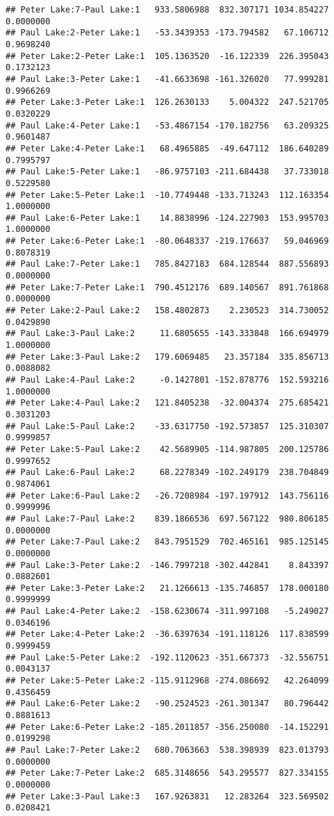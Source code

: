 \documentclass[]{article}
\begin{document}
\begin{verbatim}
## Peter Lake:7-Paul Lake:1   933.5806988  832.307171 1034.854227 0.0000000
## Paul Lake:2-Peter Lake:1   -53.3439353 -173.794582   67.106712 0.9698240
## Peter Lake:2-Peter Lake:1  105.1363520  -16.122339  226.395043 0.1732123
## Paul Lake:3-Peter Lake:1   -41.6633698 -161.326020   77.999281 0.9966269
## Peter Lake:3-Peter Lake:1  126.2630133    5.004322  247.521705 0.0320229
## Paul Lake:4-Peter Lake:1   -53.4867154 -170.182756   63.209325 0.9601487
## Peter Lake:4-Peter Lake:1   68.4965885  -49.647112  186.640289 0.7995797
## Paul Lake:5-Peter Lake:1   -86.9757103 -211.684438   37.733018 0.5229580
## Peter Lake:5-Peter Lake:1  -10.7749448 -133.713243  112.163354 1.0000000
## Paul Lake:6-Peter Lake:1    14.8838996 -124.227903  153.995703 1.0000000
## Peter Lake:6-Peter Lake:1  -80.0648337 -219.176637   59.046969 0.8078319
## Paul Lake:7-Peter Lake:1   785.8427183  684.128544  887.556893 0.0000000
## Peter Lake:7-Peter Lake:1  790.4512176  689.140567  891.761868 0.0000000
## Peter Lake:2-Paul Lake:2   158.4802873    2.230523  314.730052 0.0429890
## Paul Lake:3-Paul Lake:2     11.6805655 -143.333848  166.694979 1.0000000
## Peter Lake:3-Paul Lake:2   179.6069485   23.357184  335.856713 0.0088082
## Paul Lake:4-Paul Lake:2     -0.1427801 -152.878776  152.593216 1.0000000
## Peter Lake:4-Paul Lake:2   121.8405238  -32.004374  275.685421 0.3031203
## Paul Lake:5-Paul Lake:2    -33.6317750 -192.573857  125.310307 0.9999857
## Peter Lake:5-Paul Lake:2    42.5689905 -114.987805  200.125786 0.9997652
## Paul Lake:6-Paul Lake:2     68.2278349 -102.249179  238.704849 0.9874061
## Peter Lake:6-Paul Lake:2   -26.7208984 -197.197912  143.756116 0.9999996
## Paul Lake:7-Paul Lake:2    839.1866536  697.567122  980.806185 0.0000000
## Peter Lake:7-Paul Lake:2   843.7951529  702.465161  985.125145 0.0000000
## Paul Lake:3-Peter Lake:2  -146.7997218 -302.442841    8.843397 0.0882601
## Peter Lake:3-Peter Lake:2   21.1266613 -135.746857  178.000180 0.9999999
## Paul Lake:4-Peter Lake:2  -158.6230674 -311.997108   -5.249027 0.0346196
## Peter Lake:4-Peter Lake:2  -36.6397634 -191.118126  117.838599 0.9999459
## Paul Lake:5-Peter Lake:2  -192.1120623 -351.667373  -32.556751 0.0043137
## Peter Lake:5-Peter Lake:2 -115.9112968 -274.086692   42.264099 0.4356459
## Paul Lake:6-Peter Lake:2   -90.2524523 -261.301347   80.796442 0.8881613
## Peter Lake:6-Peter Lake:2 -185.2011857 -356.250080  -14.152291 0.0199298
## Paul Lake:7-Peter Lake:2   680.7063663  538.398939  823.013793 0.0000000
## Peter Lake:7-Peter Lake:2  685.3148656  543.295577  827.334155 0.0000000
## Peter Lake:3-Paul Lake:3   167.9263831   12.283264  323.569502 0.0208421

\end{verbatim}
\end{document}
